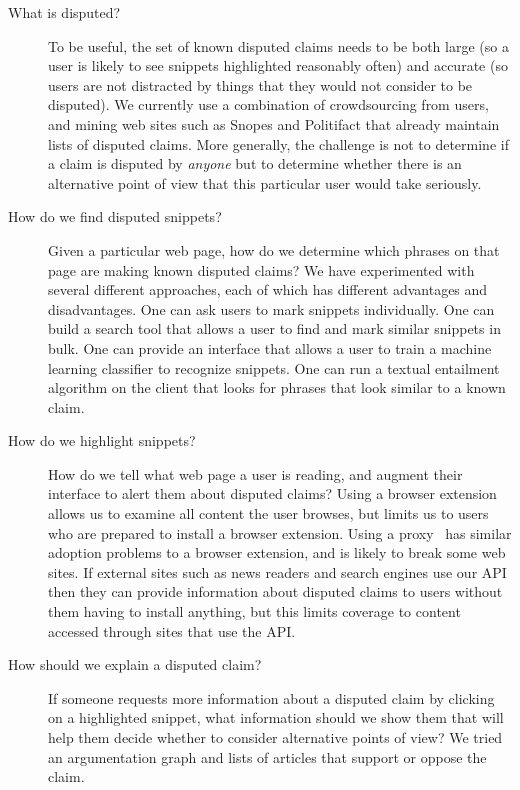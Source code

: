\documentclass{www2010-submission}
\begin{document}
\begin{description}
\item[What is disputed?] To be useful, the set of known disputed claims needs to be both large (so a user is likely to see snippets highlighted reasonably often) and accurate (so users are not distracted by things that they would not consider to be disputed). We currently use a combination of crowdsourcing from users, and mining web sites such as Snopes and Politifact that already maintain lists of disputed claims. More generally, the challenge is not to determine if a claim is disputed by {\it anyone} but to determine whether there is an alternative point of view that this particular user would take seriously.

\item[How do we find disputed snippets?] Given a particular web page, how do we determine which phrases on that page are making known disputed claims? We have experimented with several different approaches, each of which has different advantages and disadvantages. One can ask users to mark snippets individually. One can build a search tool that allows a user to find and mark similar snippets in bulk. One can provide an interface that allows a user to train a machine learning classifier to recognize snippets. One can run a textual entailment algorithm on the client that looks for phrases that look similar to a known claim. 

\item[How do we highlight snippets?] How do we tell what web page a user is reading, and augment their interface to alert them about disputed claims? Using a browser extension allows us to examine all content the user browses, but limits us to users who are prepared to install a browser extension. Using a proxy~\cite{Barrett1997} has similar adoption problems to a browser extension, and is likely to break some web sites. If external sites such as news readers and search engines use our API then they can provide information about disputed claims to users without them having to install anything, but this limits coverage to content accessed through sites that use the API.

\item[How should we explain a disputed claim?] If someone requests more information about a disputed claim by clicking on a highlighted snippet, what information should we show them that will help them decide whether to consider alternative points of view? We tried an argumentation graph and lists of articles that support or oppose the claim.
\end{description}
\end{document}
